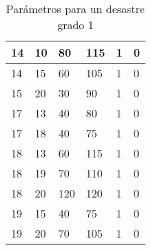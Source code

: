 \begin{table}[H]
\begin{tabular}{|l|l|l|l|l|l|}
14 & 10 & 80 & 115 & 1 & 0 \\ \hline
14 & 15 & 60 & 105 & 1 & 0 \\ \hline
15 & 20 & 30 & 90 & 1 & 0 \\ \hline
17 & 13 & 40 & 80 & 1 & 0 \\ \hline
17 & 18 & 40 & 75 & 1 & 0 \\ \hline
18 & 13 & 60 & 115 & 1 & 0 \\ \hline
18 & 19 & 70 & 110 & 1 & 0 \\ \hline
18 & 20 & 120 & 120 & 1 & 0 \\ \hline
19 & 15 & 40 & 75 & 1 & 0 \\ \hline
19 & 20 & 70 & 105 & 1 & 0 \\ \hline

\end{tabular}
\caption{Parámetros para un desastre grado 1}
\label{grade1}
\end{table}


